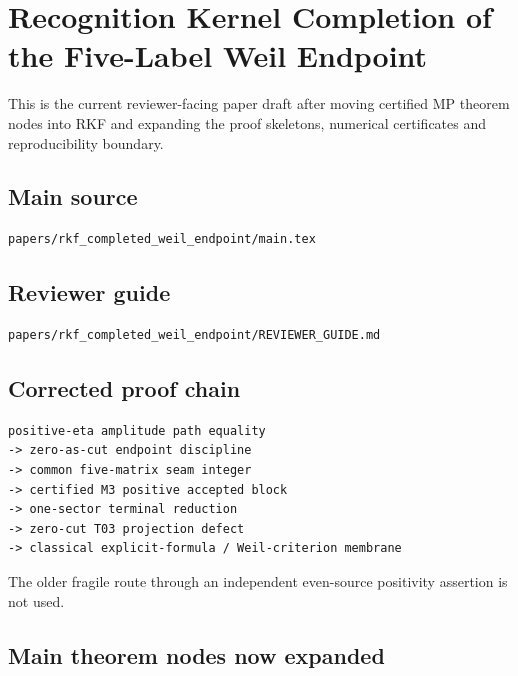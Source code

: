 \hypertarget{recognition-kernel-completion-of-the-five-label-weil-endpoint}{%
\chapter{Recognition Kernel Completion of the Five-Label Weil Endpoint}\label{recognition-kernel-completion-of-the-five-label-weil-endpoint}}

This is the current reviewer-facing paper draft after moving certified MP theorem nodes into RKF and expanding the proof skeletons, numerical certificates and reproducibility boundary.

\hypertarget{main-source}{%
\section{Main source}\label{main-source}}

\begin{verbatim}
papers/rkf_completed_weil_endpoint/main.tex
\end{verbatim}

\hypertarget{reviewer-guide}{%
\section{Reviewer guide}\label{reviewer-guide}}

\begin{verbatim}
papers/rkf_completed_weil_endpoint/REVIEWER_GUIDE.md
\end{verbatim}

\hypertarget{corrected-proof-chain}{%
\section{Corrected proof chain}\label{corrected-proof-chain}}

\begin{verbatim}
positive-eta amplitude path equality
-> zero-as-cut endpoint discipline
-> common five-matrix seam integer
-> certified M3 positive accepted block
-> one-sector terminal reduction
-> zero-cut T03 projection defect
-> classical explicit-formula / Weil-criterion membrane
\end{verbatim}

The older fragile route through an independent even-source positivity assertion is not used.

\hypertarget{main-theorem-nodes-now-expanded}{%
\section{Main theorem nodes now expanded}\label{main-theorem-nodes-now-expanded}}

